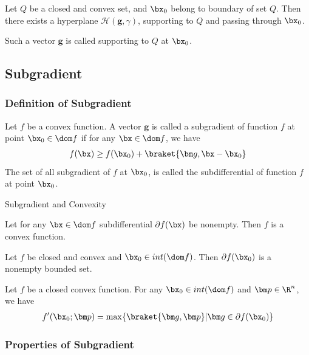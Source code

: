 \begin{theorem}
    Let $Q$ be a closed and convex set, and $\bx_0$ belong to boundary of set $Q$. Then there exists a hyperplane $\mathcal{H}(\bm g, \gamma)$, supporting to $Q$ and passing through $\bx_0$. 

    Such a vector $\bm g$ is called supporting to $Q$ at $\bx_0$. 
\end{theorem}

\subsection{Subgradient}

\subsubsection{Definition of Subgradient}

\begin{definition}
    Let $f$ be a convex function. A vector $\bm g$ is called a subgradient of function $f$ at point $\bx_0\in\dom f$ if for any $\bx\in\dom f$, we have
    \begin{align*}
        f(\bx)\ge f(\bx_0)+\braket{\bm g ,\bx-\bx_0}
    \end{align*}
    The set of all subgradient of $f$ at $\bx_0$, is called the subdifferential of function $f$ at point $\bx_0$. 
\end{definition}

Subgradient and Convexity
\begin{lemma}
    Let for any $\bx\in\dom f$ subdifferential $\partial f(\bx)$ be nonempty. Then $f$ is a convex function. 
\end{lemma}

\begin{theorem}
    Let $f$ be closed and convex and $\bx_0\in int(\dom f)$. Then $\partial f(\bx_0)$ is a nonempty bounded set. 
\end{theorem}

\begin{theorem}
    Let $f$ be a closed convex function. For any $\bx_0\in int(\dom f)$ and  $\bm p\in\R^n$, we have
    \begin{align*}
        f'(\bx_0;\bm p)=\max\{ \braket{\bm g, \bm p}|\bm g\in\partial f(\bx_0) \}
    \end{align*}
\end{theorem}

\subsubsection{Properties of Subgradient}

